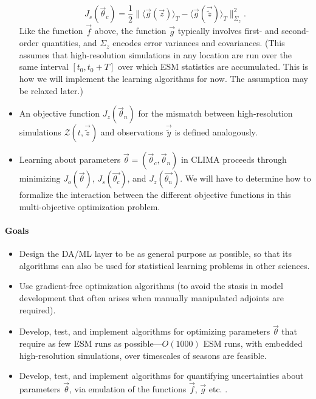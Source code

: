 \documentclass{article}
\begin{document}
\begin{itemize}
    \begin{equation}\label{e:obj_hr}
    J_s(\vec{\theta}_c)=\frac12\| \langle \vec{g}(\vec{z})  \rangle_T - \langle \vec{g}(\vec{\tilde z})
    \rangle_T \|_{\Sigma_z}^2.
    \end{equation}
    Like the function $\vec{f}$ above, the function $\vec{g}$  typically involves first- and second-order quantities, and $\Sigma_z$ encodes error variances and covariances. (This assumes that high-resolution simulations in any location are run over the same interval $[t_0, t_0+T]$ over which ESM statistics are accumulated. This is how we will implement the learning algorithms for now. The assumption may be relaxed later.) 
    \item An objective function $J_z(\vec{\theta}_n)$ for the mismatch between high-resolution simulations  $\mathcal{Z}(t, \vec{\tilde z})$ and observations $\vec{\tilde y}$ is defined analogously. 
    \item Learning about parameters $\vec{\theta} = (\vec{\theta}_c, \vec{\theta}_n)$ in CLIMA proceeds through minimizing $J_o(\vec{\theta})$, $J_s(\vec{\theta_c})$, and $J_z(\vec{\theta_n})$. We will have to determine how to formalize the interaction between the different objective functions in this multi-objective optimization problem.
\end{itemize}

\paragraph{Goals}
\begin{itemize}
    \item Design the DA/ML layer to be as general purpose as possible, so that its algorithms can also be used for statistical learning problems in other sciences.
    \item Use gradient-free optimization algorithms (to avoid the stasis in model development that often arises when manually manipulated adjoints are required).
    \item Develop, test, and implement algorithms for optimizing parameters $\vec{\theta}$ that require as few ESM runs as possible---$O(1000)$ ESM runs, with embedded high-resolution simulations, over timescales of seasons are feasible. 
    \item Develop, test, and implement algorithms for quantifying uncertainties about parameters $\vec{\theta}$, via emulation of the functions $\vec{f}$, $\vec{g}$ etc. \citep{Kennedy01a,OHagan06a}.
\end{itemize}
\end{document}
